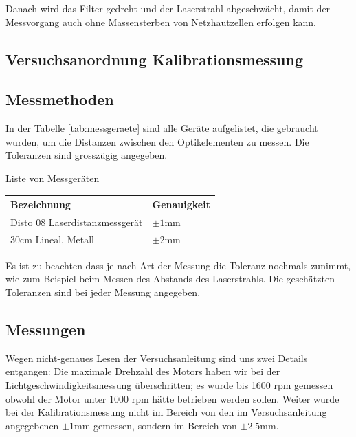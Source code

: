 Danach  wird  das  Filter  gedreht und der Laserstrahl abgeschw\"acht, damit der
Messvorgang   auch   ohne   Massensterben   von  Netzhautzellen  erfolgen  kann.


\subsection{Versuchsanordnung Kalibrationsmessung}




\subsection{Messmethoden}

In  der  Tabelle  \ref{tab:messgeraete}  sind  alle  Ger\"ate  aufgelistet,  die
gebraucht  wurden,  um  die Distanzen zwischen den Optikelementen zu messen. Die
Toleranzen  sind grossz\"ugig angegeben.

\begin{center}
    \begin{threeparttable}
        \caption{Liste von Messger\"aten}
        \label{tab:messgeraete}
        \begin{tabular}{ll}
            \toprule
            Bezeichnung                         & Genauigkeit \\
            \midrule
            Disto 08 Laserdistanzmessger\"at    & $\pm1\textrm{mm}$ \\
            $30\textrm{cm}$ Lineal, Metall      & $\pm2\textrm{mm}$ \\
            \bottomrule
        \end{tabular}
    \end{threeparttable}
\end{center}

Es ist zu beachten dass je nach Art der
Messung die Toleranz nochmals zunimmt, wie zum Beispiel beim Messen des Abstands
des Laserstrahls. Die gesch\"atzten Toleranzen sind bei jeder Messung angegeben.


\subsection{Messungen}

Wegen nicht-genaues Lesen der Versuchsanleitung sind uns zwei Details entgangen:
Die  maximale Drehzahl des Motors haben wir bei der Lichtgeschwindigkeitsmessung
\"uberschritten;  es wurde bis 1600 rpm gemessen obwohl der Motor unter 1000 rpm
h\"atte  betrieben werden sollen. Weiter wurde bei der Kalibrationsmessung nicht
im  Bereich von den im Versuchsanleitung angegebenen $\pm1\textrm{mm}$ gemessen,
sondern im Bereich von $\pm2.5\textrm{mm}$.

